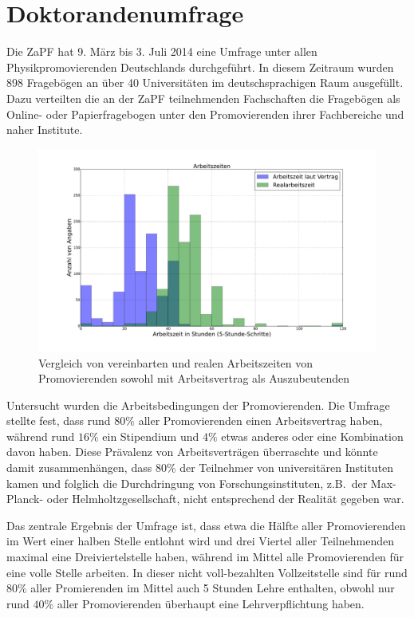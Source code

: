 \documentclass{scrartcl}
\begin{document}
\section*{Doktorandenumfrage}
Die ZaPF hat 9. März bis 3. Juli 2014 eine Umfrage unter allen Physikpromovierenden Deutschlands durchgeführt. In diesem Zeitraum wurden 898 Fragebögen an über 40 Universitäten im deutschsprachigen Raum ausgefüllt. Dazu verteilten die an der ZaPF teilnehmenden Fachschaften die Fragebögen als Online- oder Papierfragebogen unter den Promovierenden ihrer Fachbereiche und naher Institute.

\begin{figure}
	\includegraphics[width=\textwidth]{all_hours.pdf}
	\caption{Vergleich von vereinbarten und realen Arbeitszeiten von Promovierenden sowohl mit Arbeitsvertrag als Auszubeutenden}
\end{figure}

Untersucht wurden die Arbeitsbedingungen der Promovierenden. Die Umfrage stellte fest, dass rund \(80\%\) aller Promovierenden einen Arbeitsvertrag haben, während rund \(16\%\) ein Stipendium und \(4\%\) etwas anderes oder eine Kombination davon haben. Diese Prävalenz von Arbeitsverträgen überraschte und könnte damit zusammenhängen, dass 80\% der Teilnehmer von universitären Instituten kamen und folglich die Durchdringung von Forschungsinstituten, z.B.\ der Max-Planck- oder Helmholtzgesellschaft, nicht entsprechend der Realität gegeben war.

Das zentrale Ergebnis der Umfrage ist, dass etwa die Hälfte aller Promovierenden im Wert einer halben Stelle entlohnt wird und drei Viertel aller Teilnehmenden maximal eine Dreiviertelstelle haben, während im Mittel alle Promovierenden für eine volle Stelle arbeiten.
In dieser nicht voll-bezahlten Vollzeitstelle sind für rund \(80\%\) aller Promierenden im Mittel auch 5 Stunden Lehre enthalten, obwohl nur rund \(40\%\) aller Promovierenden überhaupt eine Lehrverpflichtung haben.
\end{document}
